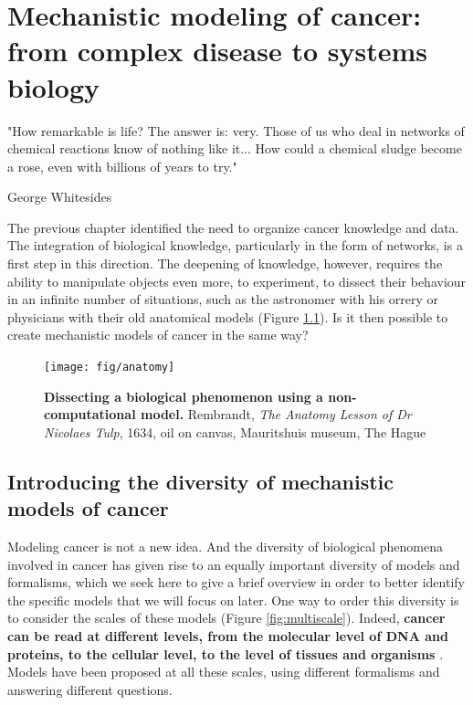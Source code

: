 \documentclass[a4paper,12pt,twoside,onecolumn,openright,final,oldfontcommands]{memoir}
\newcommand{\initial}[1]{
	\lettrine[lines=3,lhang=0.33,nindent=0em]{
		\color{gray}
     		{\textsc{#1}}}{}}
\begin{document}
\chapter{Mechanistic modeling of cancer: from complex disease to systems
biology}\label{mechanistic-cancer}

\epigraph{"How remarkable is life? The answer is: very. Those of us who deal in networks of chemical reactions know of nothing like it... How could a chemical sludge become a rose, even with billions of years to try."}{George Whitesides}

\initial{T}he previous chapter identified the need to organize cancer
knowledge and data. The integration of biological knowledge,
particularly in the form of networks, is a first step in this direction.
The deepening of knowledge, however, requires the ability to manipulate
objects even more, to experiment, to dissect their behaviour in an
infinite number of situations, such as the astronomer with his orrery or
physicians with their old anatomical models (Figure \ref{fig:anatomy}).
Is it then possible to create mechanistic models of cancer in the same
way?

\begin{figure}

{\centering \texttt{[image: fig/anatomy]} 

}

\caption[Dissecting a biological phenomenon using a non-computational model]{\textbf{Dissecting a biological phenomenon using a
non-computational model.} Rembrandt, \emph{The Anatomy Lesson of Dr
Nicolaes Tulp}, 1634, oil on canvas, Mauritshuis museum, The Hague}\label{fig:anatomy}
\end{figure}





\section{Introducing the diversity of mechanistic models of
cancer}\label{introducing-the-diversity-of-mechanistic-models-of-cancer}

Modeling cancer is not a new idea. And the diversity of biological
phenomena involved in cancer has given rise to an equally important
diversity of models and formalisms, which we seek here to give a brief
overview in order to better identify the specific models that we will
focus on later. One way to order this diversity is to consider the
scales of these models (Figure \ref{fig:multiscale}). Indeed,
\textbf{cancer can be read at different levels, from the molecular level
of DNA and proteins, to the cellular level, to the level of tissues and
organisms} \citep{anderson2008integrative}. Models have been proposed at
all these scales, using different formalisms
\citep{bellomo2008foundations} and answering different questions.
\end{document}
